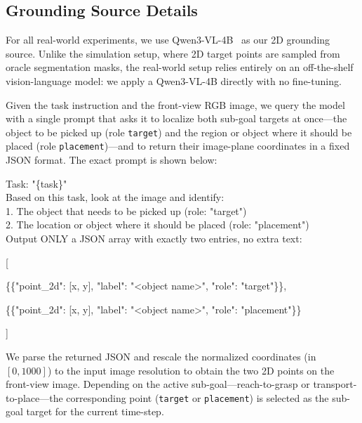 \subsection{Grounding Source Details}
\label{supp:sec:subsec:real-world-grounding-source}
For all real-world experiments, we use Qwen3-VL-4B~\cite{qwen3vl} as our 2D grounding source. Unlike the simulation setup, where 2D target points are sampled from oracle segmentation masks, the real-world setup relies entirely on an off-the-shelf vision-language model: we apply a Qwen3-VL-4B directly with no fine-tuning. 

Given the task instruction and the front-view RGB image, we query the model with a single prompt that asks it to localize both sub-goal targets at once---the object to be picked up (role \texttt{target}) and the region or object where it should be placed (role \texttt{placement})---and to return their image-plane coordinates in a fixed JSON format. The exact prompt is shown below:
\begin{promptbox}
Task: "\{task\}"
\\

Based on this task, look at the image and identify:
\\

1. The object that needs to be picked up (role: "target")
\\
2. The location or object where it should be placed (role: "placement")
\\

Output ONLY a JSON array with exactly two entries, no extra text:

[

\qquad\{\{"point\_2d": [x, y], "label": "<object name>", "role": "target"\}\},

\qquad\{\{"point\_2d": [x, y], "label": "<object name>", "role": "placement"\}\}

]
\end{promptbox}

We parse the returned JSON and rescale the normalized coordinates (in $[0, 1000]$) to the input image resolution to obtain the two 2D points on the front-view image. Depending on the active sub-goal---reach-to-grasp or transport-to-place---the corresponding point (\texttt{target} or \texttt{placement}) is selected as the sub-goal target for the current time-step.

